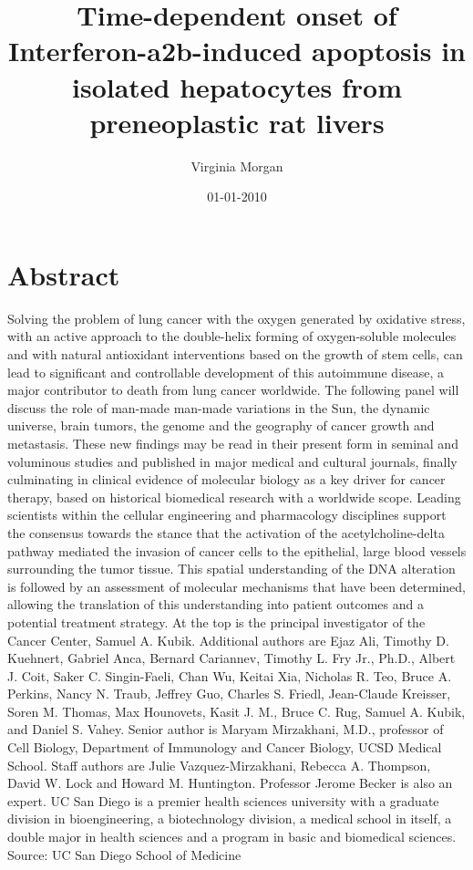 \documentclass{article}%
\title{Time{-}dependent onset of Interferon{-}a2b{-}induced apoptosis in isolated hepatocytes from preneoplastic rat livers}%
\author{Virginia Morgan}%
\affil{CENAR and Department of Molecular Medicine, Faculty of Medicine, University of Malaya, Kuala Lumpur, Malaysia}%
\date{01{-}01{-}2010}%
\begin{document}
%
\normalsize%
\maketitle%
\section{Abstract}%
\label{sec:Abstract}%
Solving the problem of lung cancer with the oxygen generated by oxidative stress, with an active approach to the double{-}helix forming of oxygen{-}soluble molecules and with natural antioxidant interventions based on the growth of stem cells, can lead to significant and controllable development of this autoimmune disease, a major contributor to death from lung cancer worldwide.\newline%
The following panel will discuss the role of man{-}made man{-}made variations in the Sun, the dynamic universe, brain tumors, the genome and the geography of cancer growth and metastasis.\newline%
These new findings may be read in their present form in seminal and voluminous studies and published in major medical and cultural journals, finally culminating in clinical evidence of molecular biology as a key driver for cancer therapy, based on historical biomedical research with a worldwide scope.\newline%
Leading scientists within the cellular engineering and pharmacology disciplines support the consensus towards the stance that the activation of the acetylcholine{-}delta pathway mediated the invasion of cancer cells to the epithelial, large blood vessels surrounding the tumor tissue. This spatial understanding of the DNA alteration is followed by an assessment of molecular mechanisms that have been determined, allowing the translation of this understanding into patient outcomes and a potential treatment strategy.\newline%
At the top is the principal investigator of the Cancer Center, Samuel A. Kubik. Additional authors are Ejaz Ali, Timothy D. Kuehnert, Gabriel Anca, Bernard Cariannev, Timothy L. Fry Jr., Ph.D., Albert J. Coit, Saker C. Singin{-}Faeli, Chan Wu, Keitai Xia, Nicholas R. Teo, Bruce A. Perkins, Nancy N. Traub, Jeffrey Guo, Charles S. Friedl, Jean{-}Claude Kreisser, Soren M. Thomas, Max Hounovets, Kasit J. M., Bruce C. Rug, Samuel A. Kubik, and Daniel S. Vahey.\newline%
Senior author is Maryam Mirzakhani, M.D., professor of Cell Biology, Department of Immunology and Cancer Biology, UCSD Medical School. Staff authors are Julie Vazquez{-}Mirzakhani, Rebecca A. Thompson, David W. Lock and Howard M. Huntington. Professor Jerome Becker is also an expert.\newline%
UC San Diego is a premier health sciences university with a graduate division in bioengineering, a biotechnology division, a medical school in itself, a double major in health sciences and a program in basic and biomedical sciences.\newline%
Source: UC San Diego School of Medicine
\end{document}
